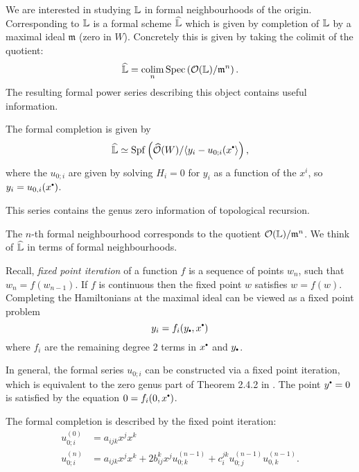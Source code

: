     We are interested in studying \( \mathbb{L}\) in formal neighbourhoods of the origin. Corresponding to \(\mathbb{L} \) is a formal scheme \( \widehat{\mathbb{L} \hspace{0pt} } \) which is given by completion of \(\mathbb{L} \) by a maximal ideal \( \mathfrak{m}\) (zero in \(W\)). Concretely this is given by taking the colimit of the quotient: 
    \[ \widehat{\mathbb{L}} = \operatorname*{colim}_n  \mathrm{Spec} \left( \mathcal{O}(\mathbb{L} )/\mathfrak{m}^n \right). \]
    The resulting formal power series describing this object contains useful information. 
    \begin{prop}The formal completion is given by
    \[ \widehat{\cL} \simeq \Spf \left(\widehat{\mathcal{O}}( W) /\langle y_i - u_{0;i}(x^{\sbt} \rangle \right), \]
    where the \(u_{0;i}\) are given by solving \(H_i= 0\) for \(y_i\) as a function of the \(x^i\), so \( y_i = u_{0,i}(x^{\sbt}) \).
    \end{prop}
        
    \begin{rem}
    This series contains the genus zero information of topological recursion.
    \end{rem}    

    
    
    \begin{rem}
    The \(n\)-th formal neighbourhood corresponds to the quotient \( \mathcal{O}(\mathbb{L})/\mathfrak{m}^n\). We think of \( \widehat{\mathbb{L}} \) in terms of formal neighbourhoods.
    \end{rem}
    
    Recall, \emph{fixed point iteration} of a function \(f\) is a sequence of points \(w_n\), such that \(w_{n} = f(w_{n-1})\). If \(f\) is continuous then the fixed point \(w\) satisfies \(w=f(w)\). Completing the Hamiltonians at the maximal ideal can be viewed as a fixed point problem
    \[ y_i = f_i(y_{\sbt},x^{\sbt})\]
    where \(f_i\) are the remaining degree \(2\) terms in \(x^{\sbt}\) and \(y_{\sbt}\). 
    
    In general, the formal series \(u_{0;i}\) can be constructed via a fixed point iteration, which is equivalent to the zero genus part of Theorem 2.4.2 in \cite{ks_airy}. The point \(y^{\sbt} = 0\) is satisfied by the equation \( 0 = f_i(0,x^{\sbt})\).
    
    \begin{thm}
    The formal completion is described by the fixed point iteration:
    \begin{align*} 
    u_{0;i}^{(0)} &= a_{ijk} x^j x^k \\
    u_{0;i}^{(n)} &= a_{ijk} x^j x^k + 2 b_{ij}^k x^j u^{(n-1)}_{0;k} + c_{i}^{jk} u^{(n-1)}_{0;j} u^{(n-1)}_{0,k}.
    \end{align*}
    \end{thm}
    
